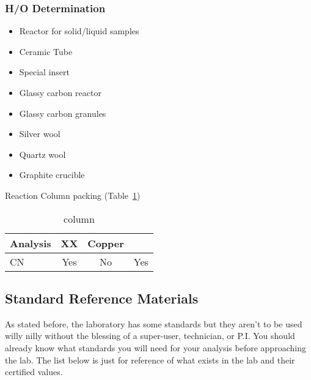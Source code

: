\documentclass[12pt]{../SOP4_alpha}\usepackage[]{graphicx}\usepackage[]{color}
\begin{document}
\subsubsection{H/O Determination}

\begin{itemize}
  \item {Reactor for solid/liquid samples}
  \item {Ceramic Tube}
  \item {Special insert}
  \item {Glassy carbon reactor}
  \item {Glassy carbon granules}
  \item {Silver wool}
  \item {Quartz wool} 
  \item {Graphite crucible}
\end{itemize}

\NP Reaction Column packing (Table~\ref{column})

\begin{table}[h]
\label{column}
\caption{column}
\centering
\begin{tabular}{lccc} \hline
Analysis      & XX    & Copper  & \\ \hline\hline
CN            & Yes   & No      & Yes \\ \hline
\end{tabular}
\end{table}

\subsection{Standard Reference Materials} \label{subsec:Standard Reference Materials}

\NP As stated before, the laboratory has some standards but they aren't to be used willy nilly without the blessing of a super-user, technician, or P.I. You should already know what standards you will need for your analysis before approaching the lab. The list below is just for reference of what exists in the lab and their certified values.
\end{document}
